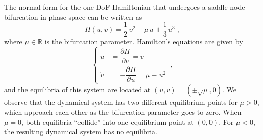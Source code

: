 \documentclass{ws-ijbc}
\begin{document}
The normal form for the one DoF Hamiltonian that undergoes a saddle-node bifurcation in phase space\cite{Wiggins2017book} can be written as
\begin{equation}
H(u,v) = \frac{1}{2} \, v^2  - \mu \, u + \frac{1}{3} \,u^3 \;,
\label{eqn:ham_1dof}
\end{equation}
where $\mu \in \mathbb{R}$ is the bifurcation parameter. Hamilton's equations are given by
\begin{equation}
\left\{
\begin{aligned}
\dot{u} &= \dfrac{\partial H}{\partial v} = v \\[.3cm]
\dot{v} & = -\dfrac{\partial H}{\partial u} = \mu - u^2
\end{aligned}
\right. \;,
\label{eq:hameq1}
\end{equation}
and the equilibria of this system are located at $(u,v) = (\pm\sqrt{\mu},0)$. We observe that the dynamical system has two different equilibrium points for $\mu  > 0$, which approach each other as the bifurcation parameter goes to zero. When $\mu = 0$, both equilibria ``collide'' into one equilibrium point at $(0,0)$. For $\mu < 0$, the resulting dynamical system has no equilibria. 
\end{document}
